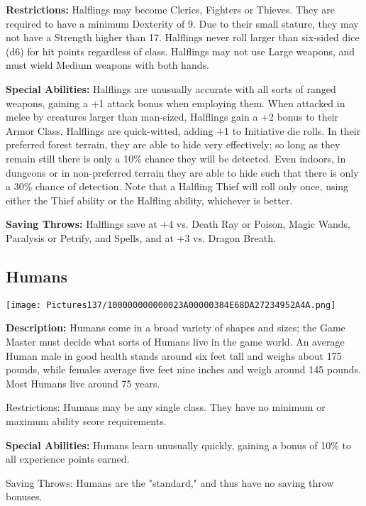 \documentclass[a4paper,twoside,openany,10pt]{book}
\begin{document}
\begin{multicols}{2}
\textbf{Restrictions: } Halflings may become Clerics, Fighters or Thieves. They are required to have a minimum Dexterity of 9. Due to their small stature, they may not have a Strength higher than 17. Halflings never roll larger than six-sided dice (d6) for hit points regardless of class. Halflings may not use Large weapons, and must wield Medium weapons with both hands.

\textbf{Special Abilities:} Halflings are unusually accurate with all sorts of ranged weapons, gaining a +1 attack bonus when employing them. When attacked in melee by creatures larger than man-sized, Halflings gain a +2 bonus to their Armor Class. Halflings are quick-witted, adding +1 to Initiative die rolls. In their preferred forest terrain, they are able to hide very effectively; so long as they remain still there is only a 10\% chance they will be detected. Even indoors, in dungeons or in non-preferred terrain they are able to hide such that there is only a 30\% chance of detection. Note that a Halfling Thief will roll only once, using either the Thief ability or the Halfling ability, whichever is better.

\textbf{Saving Throws:} Halflings save at +4 vs. Death Ray or Poison, Magic Wands, Paralysis or Petrify, and Spells, and at +3 vs. Dragon Breath.

\subsection{Humans}\label{humans}

\begin{center}
	\texttt{[image: Pictures137/100000000000023A00000384E68DA27234952A4A.png]}
\end{center}\medskip

\textbf{Description:} Humans come in a broad variety of shapes and sizes; the Game Master must decide what sorts of Humans live in the game world. An average Human male in good health stands around six feet tall and weighs about 175 pounds, while females average five feet nine inches and weigh around 145 pounds. Most Humans live around 75 years.

Restrictions: Humans may be any single class. They have no minimum or maximum ability score requirements.

\textbf{Special Abilities:} Humans learn unusually quickly, gaining a bonus of 10\% to all experience points earned.

Saving Throws: Humans are the "standard," and thus have no saving throw bonuses.



\end{multicols}
\end{document}
